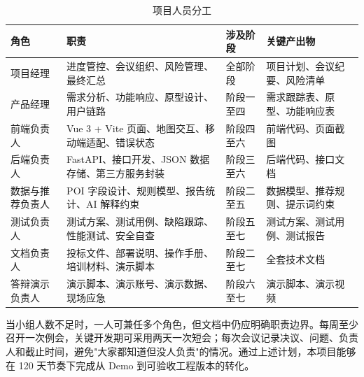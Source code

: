 \begin{table}[htbp]
  \captionsetup{justification=raggedright,singlelinecheck=false}
  \small
  \caption{项目人员分工}
  \label{tab:personnel}
  \begin{tabularx}{\textwidth}{>{\raggedright\arraybackslash}p{2.2cm}|>{\raggedright\arraybackslash}p{4.0cm}|X|>{\raggedright\arraybackslash}p{2.5cm}}
    \toprule
    \textbf{角色} & \textbf{职责} & \textbf{涉及阶段} & \textbf{关键产出物} \\
    \midrule
    项目经理 & 进度管控、会议组织、风险管理、最终汇总 & 全部阶段 & 项目计划、会议纪要、风险清单 \\
    \hline
    产品经理 & 需求分析、功能响应、原型设计、用户链路 & 阶段一至四 & 需求跟踪表、原型、功能响应表 \\
    \hline
    前端负责人 & Vue 3 + Vite 页面、地图交互、移动端适配、错误状态 & 阶段四至六 & 前端代码、页面截图 \\
    \hline
    后端负责人 & FastAPI、接口开发、JSON 数据存储、第三方服务封装 & 阶段三至六 & 后端代码、接口文档 \\
    \hline
    数据与推荐负责人 & POI 字段设计、规则模型、报告统计、AI 解释约束 & 阶段二至五 & 数据模型、推荐规则、提示词约束 \\
    \hline
    测试负责人 & 测试方案、测试用例、缺陷跟踪、性能测试、安全自查 & 阶段五至七 & 测试方案、测试用例、测试报告 \\
    \hline
    文档负责人 & 投标文件、部署说明、操作手册、培训材料、演示脚本 & 阶段二至七 & 全套技术文档 \\
    \hline
    答辩演示负责人 & 演示脚本、演示账号、演示数据、现场应急 & 阶段六至七 & 演示脚本、演示视频 \\
    \bottomrule
  \end{tabularx}
\end{table}

当小组人数不足时，一人可兼任多个角色，但文档中仍应明确职责边界。每周至少召开一次例会，关键开发期可采用两天一次短会；每次会议记录决议、问题、负责人和截止时间，避免"大家都知道但没人负责"的情况。通过上述计划，本项目能够在 120 天节奏下完成从 Demo 到可验收工程版本的转化。
